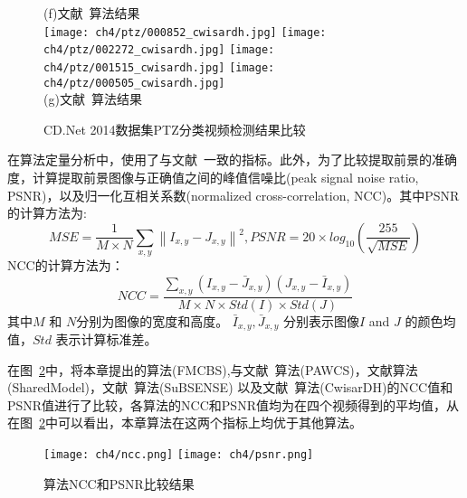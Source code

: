 \begin{figure}[htbp]
  (f)文献~算法结果\\
  \texttt{[image: ch4/ptz/000852\_cwisardh.jpg]}
  \texttt{[image: ch4/ptz/002272\_cwisardh.jpg]}
  \texttt{[image: ch4/ptz/001515\_cwisardh.jpg]}
  \texttt{[image: ch4/ptz/000505\_cwisardh.jpg]}\\
  (g)文献~算法结果\\
  \caption{CD.Net 2014数据集\cite{CD2014}PTZ分类视频检测结果比较}\label{ch4:fig:ptzResults}
\end{figure} \par

在算法定量分析中，使用了与文献~\cite{CD2014}一致的指标。此外，为了比较提取前景的准确度，计算提取前景图像与正确值之间的峰值信噪比(peak signal noise ratio, PSNR)，以及归一化互相关系数(normalized cross-correlation, NCC)。其中PSNR的计算方法为:
 $$MSE=\frac{1}{M\times N}\sum_{x,y}\left \| I_{x,y}-J_{x,y} \right \|^{2},PSNR = 20\times log_{10}\left ( \frac{255}{\sqrt{MSE}}\right )$$
 NCC的计算方法为：
$$NCC=\frac{\sum_{x,y}\left( I_{x,y}-\bar J_{x,y}\right )\left(J_{x,y}- \bar I_{x,y} \right )}{M\times N\times Std(I) \times Std(J)}$$
 其中$M$ 和 $N$分别为图像的宽度和高度。 $\bar I_{x,y},\bar J_{x,y}$ 分别表示图像$I$ and $J$ 的颜色均值，$Std$ 表示计算标准差。\par
 在图~\ref{ch4:fig:nccPSNR}中，将本章提出的算法(FMCBS),与文献~算法(PAWCS)，文献算法(SharedModel)，文献~算法(SuBSENSE) 以及文献~算法(CwisarDH)的NCC值和PSNR值进行了比较，各算法的NCC和PSNR值均为在四个视频得到的平均值，从在图~\ref{ch4:fig:nccPSNR}中可以看出，本章算法在这两个指标上均优于其他算法。
\begin{figure}[htb]
  \centering%
    {\texttt{[image: ch4/ncc.png]}}%
 \hspace{1em}%
      {\texttt{[image: ch4/psnr.png]}}

  \caption{算法NCC和PSNR比较结果}
  \label{ch4:fig:nccPSNR}
\end{figure}


